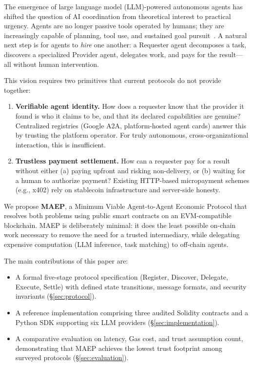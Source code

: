 \documentclass[conference]{IEEEtran}
\begin{document}
The emergence of large language model (LLM)-powered autonomous agents
has shifted the question of AI coordination from theoretical interest
to practical urgency.  Agents are no longer passive tools operated by
humans; they are increasingly capable of planning, tool use, and
sustained goal pursuit~\cite{park2023generative}.  A natural next step
is for agents to \emph{hire} one another: a Requester agent
decomposes a task, discovers a specialized Provider agent, delegates
work, and pays for the result---all without human intervention.

This vision requires two primitives that current protocols do not
provide together:

\begin{enumerate}
\item \textbf{Verifiable agent identity.}  How does a requester know
  that the provider it found is who it claims to be, and that its
  declared capabilities are genuine?  Centralized registries (Google
  A2A, platform-hosted agent cards) answer this by trusting the
  platform operator.  For truly autonomous, cross-organizational
  interaction, this is insufficient.

\item \textbf{Trustless payment settlement.}  How can a requester pay
  for a result without either (a) paying upfront and risking
  non-delivery, or (b) waiting for a human to authorize payment?
  Existing HTTP-based micropayment schemes (e.g., x402) rely on
  stablecoin infrastructure and server-side honesty.
\end{enumerate}

We propose \textbf{MAEP}, a Minimum Viable Agent-to-Agent Economic
Protocol that resolves both problems using public smart contracts on an
EVM-compatible blockchain.  MAEP is deliberately minimal: it does the
least possible on-chain work necessary to remove the need for a trusted
intermediary, while delegating expensive computation (LLM inference,
task matching) to off-chain agents.

The main contributions of this paper are:

\begin{itemize}
\item A formal five-stage protocol specification (Register, Discover,
  Delegate, Execute, Settle) with defined state transitions, message
  formats, and security invariants (\S\ref{sec:protocol}).

\item A reference implementation comprising three audited Solidity
  contracts and a Python SDK supporting six LLM providers
  (\S\ref{sec:implementation}).

\item A comparative evaluation on latency, Gas cost, and trust
  assumption count, demonstrating that MAEP achieves the lowest trust
  footprint among surveyed protocols (\S\ref{sec:evaluation}).
\end{itemize}
\end{document}
